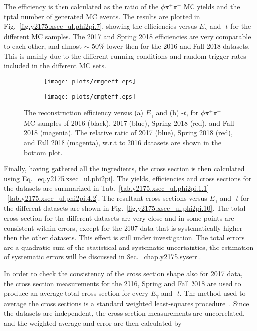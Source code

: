 The efficiency is then calculated as the ratio of the $\phi \pi^+ \pi^-$ MC yields and the tptal number of generated MC events. The results are plotted in Fig.~\ref{fig.y2175.xsec_ul.phi2pi.7}, showing the efficiencies versus $E_{\gamma}$ and -$t$ for the different MC samples. The 2017 and Spring 2018 efficiencies are very comparable to each other, and almost $\sim$ $50\%$ lower then for the 2016 and Fall 2018 datasets. This is mainly due to the different running conditions and random trigger rates included in the different MC sets.

\begin{figure}[t]
    \centering
    \begin{subfigure}[b]{0.5\textwidth}
        \texttt{[image: plots/cmgeeff.eps]}
        \caption{}
        \label{fig.y2175.xsec_ul.phi2pi.9.a}
    \end{subfigure}\hfill
    \begin{subfigure}[b]{0.5\textwidth}
        \texttt{[image: plots/cmgteff.eps]}
        \caption{}
        \label{fig.y2175.xsec_ul.phi2pi.9.b}
    \end{subfigure}
    \caption{\label{fig.y2175.xsec_ul.phi2pi.9}The reconstruction efficiency versus (a) $E_{\gamma}$ and (b) -$t$, for $\phi \pi^+ \pi^-$ MC samples of 2016 (black), 2017 (blue), Spring 2018 (red), and Fall 2018 (magenta). The relative ratio of 2017 (blue), Spring 2018 (red), and Fall 2018 (magenta), w.r.t to 2016 datasets are shown in the bottom plot.}
\end{figure}

Finally, having gathered all the ingredients, the cross section is then calculated using Eq.~\ref{eq.y2175.xsec_ul.phi2pi}. The yields, efficiencies and cross sections for the datasets are summarized in Tab.~\ref{tab.y2175.xsec_ul.phi2pi.1.1} -~\ref{tab.y2175.xsec_ul.phi2pi.4.2}. The resultant cross sections versus $E_{\gamma}$ and -$t$ for the different datasets are shown in Fig.~\ref{fig.y2175.xsec_ul.phi2pi.10}. The total cross section for the different datasets are very close and in some points are consistent within errors, except for the 2107 data that is systematically higher then the other datasets. This effect is still under investigation. The total errors are a quadratic sum of the statistical and systematic uncertainties, the estimation of systematic errors will be discussed in Sec.~\ref{chap.y2175.syserr}.
~\par In order to check the consistency of the cross section shape also for 2017 data, the cross section measurements for the 2016, Spring and Fall 2018 are used to produce an average total cross section for every $E_{\gamma}$ and -$t$. The method used to average the cross sections is a standard weighted least-squares procedure~\cite{Tanabashi18}. Since the datasets are independent, the cross section measurements are uncorrelated, and the weighted average and error are then calculated by

